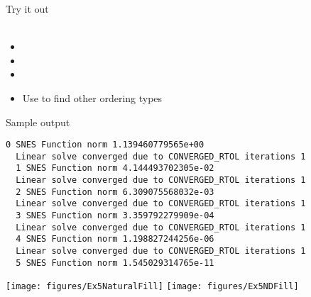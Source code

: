 \begin{frame}{Try it out}
   \\
   \\
  \begin{itemize}
  \item {}
  \item {}
  \item {}
  \item Use  to find other ordering types
\end{itemize}
\end{frame}

\begin{frame}[fragile]{Sample output}
\begin{Verbatim}[formatcom=\footnotesize]
  0 SNES Function norm 1.139460779565e+00
  Linear solve converged due to CONVERGED_RTOL iterations 1
  1 SNES Function norm 4.144493702305e-02
  Linear solve converged due to CONVERGED_RTOL iterations 1
  2 SNES Function norm 6.309075568032e-03
  Linear solve converged due to CONVERGED_RTOL iterations 1
  3 SNES Function norm 3.359792279909e-04
  Linear solve converged due to CONVERGED_RTOL iterations 1
  4 SNES Function norm 1.198827244256e-06
  Linear solve converged due to CONVERGED_RTOL iterations 1
  5 SNES Function norm 1.545029314765e-11
\end{Verbatim}
\vspace{-1em}
\texttt{[image: figures/Ex5NaturalFill]}
\texttt{[image: figures/Ex5NDFill]}
\end{frame}

